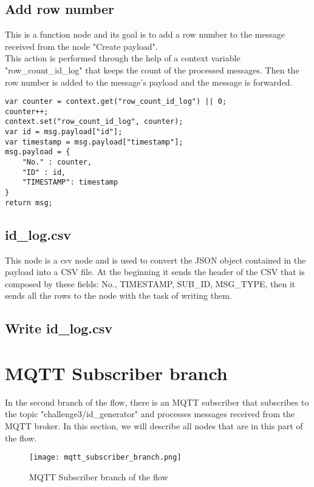\subsection{Add row number}
This is a function node and its goal is to add a row number to the message received from the node "Create payload".\\
This action is performed through the help of a context variable "row_count_id_log" that keeps the count of the processed messages.
Then the row number is added to the message's payload and the message is forwarded.

\begin{verbatim}
var counter = context.get("row_count_id_log") || 0;
counter++;
context.set("row_count_id_log", counter);
var id = msg.payload["id"];
var timestamp = msg.payload["timestamp"];
msg.payload = {
    "No." : counter,
    "ID" : id,
    "TIMESTAMP": timestamp
}
return msg;
\end{verbatim}
\subsection{id\_log.csv}
This node is a csv node and is used to convert the JSON object contained in the payload into a CSV file.
At the beginning it sends the header of the CSV that is composed by these fields: No., TIMESTAMP, SUB\_ID, MSG\_TYPE, then it sends all the rows to the node with the task of writing them.

\subsection{Write id\_log.csv}


\section{MQTT Subscriber branch}
\label{sec:subscriber_branch}

In the second branch of the flow, there is an MQTT subscriber that subscribes to the topic "challenge3/id\_generator" and processes messages received from the MQTT broker. In this section, we will describe all nodes that are in this part of the flow.

\begin{figure}[H]
    \centering
    \texttt{[image: mqtt\_subscriber\_branch.png]}
    \caption{MQTT Subscriber branch of the flow}
\end{figure}

